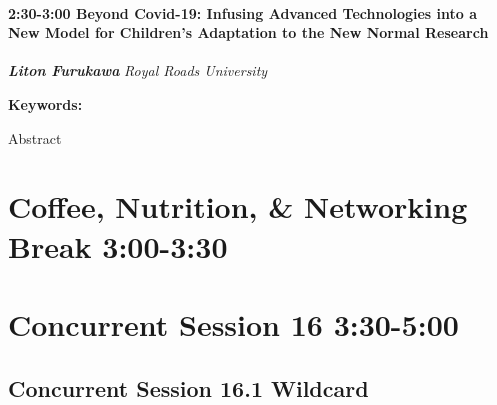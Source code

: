 \documentclass[
]{book}
\begin{document}
\begin{session}
\hypertarget{beyond-covid-19-infusing-advanced-technologies-into-a-new-model-for-childrens-adaptation-to-the-new-normal-research}{%
\paragraph*{\texorpdfstring{2:30-3:00 \textbar{} \textbf{Beyond
Covid-19: Infusing Advanced Technologies into a New Model for Children's
Adaptation to the New Normal} \textbar{}
Research}{2:30-3:00 \textbar{} Beyond Covid-19: Infusing Advanced Technologies into a New Model for Children's Adaptation to the New Normal \textbar{} Research}}\label{beyond-covid-19-infusing-advanced-technologies-into-a-new-model-for-childrens-adaptation-to-the-new-normal-research}}

\textbf{\emph{Liton Furukawa}} \textbar{} \emph{Royal Roads University}

\textbf{Keywords:}

Abstract
\end{session}

\hypertarget{coffee-nutrition-networking-break-300-330-3}{%
\section*{Coffee, Nutrition, \& Networking Break \textbar{} 3:00-3:30}\label{coffee-nutrition-networking-break-300-330-3}}

\hypertarget{concurrent-session-16-330-500}{%
\section*{Concurrent Session 16 \textbar{} 3:30-5:00}\label{concurrent-session-16-330-500}}

\hypertarget{concurrent-session-16.1-wildcard}{%
\subsection*{Concurrent Session 16.1 \textbar{} Wildcard}\label{concurrent-session-16.1-wildcard}}
\end{document}
